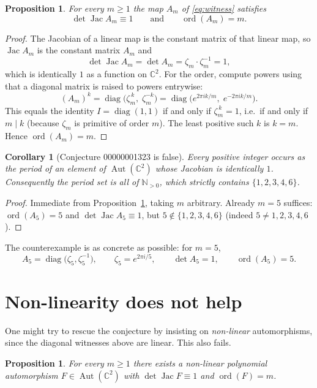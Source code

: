 \documentclass[11pt]{article}
\newtheorem{proposition}[theorem]{Proposition}
\newtheorem{corollary}[theorem]{Corollary}
\theoremstyle{remark}
\newcommand{\Aut}{\operatorname{Aut}}
\newcommand{\Jac}{\operatorname{Jac}}
\newcommand{\diag}{\operatorname{diag}}
\newcommand{\C}{\mathbb{C}}
\newcommand{\ord}{\operatorname{ord}}
\begin{document}
\begin{proposition}\label{prop:main}
For every $m\ge 1$ the map $A_m$ of \eqref{eq:witness} satisfies
\[
  \det \Jac A_m \equiv 1
  \qquad\text{and}\qquad
  \ord(A_m)=m .
\]
\end{proposition}

\begin{proof}
The Jacobian of a linear map is the constant matrix of that linear map, so
$\Jac A_m$ is the constant matrix $A_m$ and
\[
  \det \Jac A_m=\det A_m=\zeta_m\cdot\zeta_m^{-1}=1,
\]
which is identically $1$ as a function on $\C^2$. For the order, compute powers
using that a diagonal matrix is raised to powers entrywise:
\[
  (A_m)^k
  =\diag\bigl(\zeta_m^{\,k},\;\zeta_m^{-k}\bigr)
  =\diag\bigl(e^{2\pi i k/m},\;e^{-2\pi i k/m}\bigr).
\]
This equals the identity $I=\diag(1,1)$ if and only if
$\zeta_m^{\,k}=1$, i.e.\ if and only if $m\mid k$ (because $\zeta_m$ is primitive
of order $m$). The least positive such $k$ is $k=m$. Hence $\ord(A_m)=m$.
\end{proof}

\begin{corollary}[Conjecture 00000001323 is false]
\label{cor:false}
Every positive integer occurs as the period of an element of $\Aut(\C^2)$ whose
Jacobian is identically $1$. Consequently the period set is all of $\mathbb{N}_{>0}$,
which strictly contains $\{1,2,3,4,6\}$.
\end{corollary}

\begin{proof}
Immediate from Proposition~\ref{prop:main}, taking $m$ arbitrary. Already
$m=5$ suffices: $\ord(A_5)=5$ and $\det\Jac A_5\equiv 1$, but
$5\notin\{1,2,3,4,6\}$ (indeed $5\ne 1,2,3,4,6$).
\end{proof}

The counterexample is as concrete as possible: for $m=5$,
\[
  A_5=\diag\bigl(\zeta_5,\zeta_5^{-1}\bigr),
  \qquad \zeta_5=e^{2\pi i/5},
  \qquad \det A_5=1,\qquad \ord(A_5)=5 .
\]

\section{Non-linearity does not help}

One might try to rescue the conjecture by insisting on \emph{non-linear}
automorphisms, since the diagonal witnesses above are linear. This also fails.

\begin{proposition}\label{prop:nonlinear}
For every $m\ge 1$ there exists a non-linear polynomial automorphism
$F\in\Aut(\C^2)$ with $\det\Jac F\equiv 1$ and $\ord(F)=m$.
\end{proposition}
\end{document}
